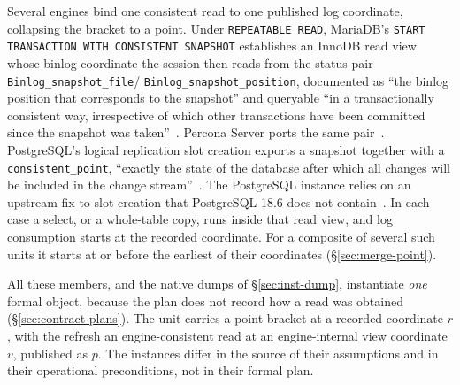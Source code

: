 \documentclass[sigconf,nonacm,10pt]{acmart}
\theoremstyle{plain}
\theoremstyle{definition}
\begin{document}
Several engines bind one consistent read to one published log
coordinate, collapsing the bracket to a point. Under
\texttt{REPEATABLE READ}, MariaDB's
\texttt{START TRANSACTION WITH CONSISTENT SNAPSHOT} establishes an
InnoDB read view whose binlog coordinate the session then reads
from the status pair
\texttt{Binlog\_\allowbreak{}snapshot\_\allowbreak{}file}/\allowbreak
\texttt{Binlog\_\allowbreak{}snapshot\_\allowbreak{}position},
documented as ``the binlog position that corresponds to the
snapshot'' and queryable ``in a transactionally consistent way,
irrespective of which other transactions have been committed since
the snapshot was taken''~\cite{mariadb_consistent_snapshot,mariadb_binlog_status_vars,mariadb_snapshot_coordinates}.
Percona Server ports the same
pair~\cite{percona_consistent_snapshot}. PostgreSQL's logical
replication slot creation exports a snapshot together with a
\texttt{consistent\_point}, ``exactly the state of the database
after which all changes will be included in the change
stream''~\cite{postgres_protocol_replication,postgres_logicaldecoding}.
The PostgreSQL instance relies on an upstream fix to slot creation that
PostgreSQL 18.6 does not contain~\cite{postgres_initial_snapshot_fix}.
In each case a select, or a whole-table copy, runs inside that
read view, and log consumption starts at the recorded coordinate. For
a composite of several such units it starts at or before the earliest
of their coordinates (\S\ref{sec:merge-point}).

All these members, and the native dumps of
\S\ref{sec:inst-dump}, instantiate \emph{one} formal object,
because the plan does not record how a read was obtained
(\S\ref{sec:contract-plans}). The unit carries a point
bracket at a recorded coordinate $r$, with the refresh an
engine-consistent read at an engine-internal view coordinate $v$,
published as $p$. The instances differ in the source of their
assumptions and in their operational preconditions, not in their
formal plan.
\end{document}
